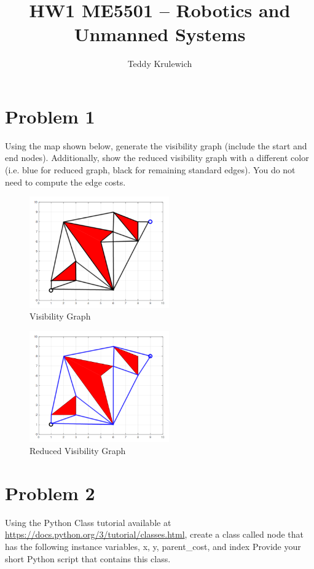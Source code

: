 \documentclass{article}
\author{Teddy Krulewich}
\title{\vspace{-4em}HW1 ME5501 – Robotics and Unmanned Systems}
\begin{document}
\maketitle

\section*{Problem 1}

Using the map shown below, generate the visibility graph (include the start and end nodes). 
Additionally, show the reduced visibility graph with a different color (i.e. blue for reduced graph, 
black for remaining standard edges). You do not need to compute the edge costs. 

\begin{figure}[h]
    \centering
    \includegraphics[width=6cm]{question1-visibility.png}
    \caption*{Visibility Graph}
\end{figure}

\begin{figure}[h]
    \centering
    \includegraphics[width=6cm]{question1-reduced-visibility.png}
    \caption*{Reduced Visibility Graph}
\end{figure}

\section*{Problem 2}

Using the Python Class tutorial available at \url{https://docs.python.org/3/tutorial/classes.html},
create a class called node that has the following instance variables, x, y, parent\_cost, and index
Provide your short Python script that contains this class. 
\end{document}
